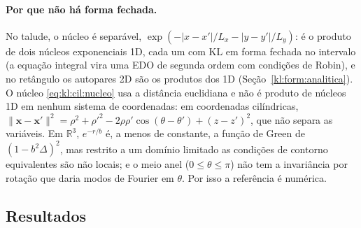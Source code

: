 \paragraph{Por que não há forma fechada.}
No talude, o núcleo é separável, $\exp(-|x - x'|/L_x - |y - y'|/L_y)$: é o produto de dois núcleos exponenciais 1D,
cada um com KL em forma fechada no intervalo (a equação integral vira uma EDO de segunda ordem com condições de Robin),
e no retângulo os autopares 2D são os produtos dos 1D (Seção~\ref{kl:form:analitica}). O núcleo
\eqref{eq:kl:cil:nucleo} usa a distância euclidiana e não é produto de núcleos 1D em nenhum sistema de coordenadas: em
coordenadas cilíndricas,
$\lVert \mathbf{x} - \mathbf{x}' \rVert^2 = \rho^2 + \rho'^2 - 2\rho\rho'\cos(\theta - \theta') + (z - z')^2$, que
não separa as variáveis. Em $\mathbb{R}^3$, $e^{-r/b}$ é, a menos de constante, a função de Green de
$(1 - b^2\Delta)^2$, mas restrito a um domínio limitado as condições de contorno equivalentes são não locais; e o meio
anel ($0 \le \theta \le \pi$) não tem a invariância por rotação que daria modos de Fourier em $\theta$. Por isso a
referência é numérica.

\subsection{Resultados}\label{sec:kl:cil:resultados}

